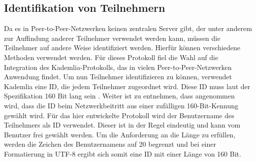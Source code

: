 \subsection{Identifikation von Teilnehmern}
\label{subsec:identifikation_von_teilnehmern}


\noindent Da es in Peer-to-Peer-Netzwerken keinen zentralen Server gibt, der unter anderem zur Auffindung anderer Teilnehmer verwendet werden kann, müssen die Teilnehmer auf andere Weise identifiziert werden. Hierfür können verschiedene Methoden verwendet werden. Für dieses Protokoll fiel die Wahl auf die Integration des Kademlia-Protokolls, das in vielen Peer-to-Peer-Netzwerken Anwendung findet. Um nun Teilnehmer identifizieren zu können, verwendet Kademlia eine ID, die jedem Teilnehmer zugeordnet wird. Diese ID muss laut der Spezifikation 160 Bit lang sein \Parencite[S. 2]{Maymounkov_Kademlia}. Weiter ist zu entnehmen, dass angenommen wird, dass die ID beim Netzwerkbeitritt aus einer zufälligen 160-Bit-Kennung gewählt wird. Für das hier entwickelte Protokoll wird der Benutzername des Teilnehmers als ID verwendet. Dieser ist in der Regel eindeutig und kann vom Benutzer frei gewählt werden. Um die Anforderung an die Länge zu erfüllen, werden die Zeichen des Benutzernamens auf 20 begrenzt und bei einer Formatierung in UTF-8 ergibt sich somit eine ID mit einer Länge von 160 Bit.
